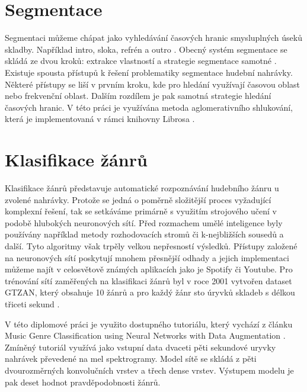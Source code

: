 \section{Segmentace} \label{sec:Teorie_Segmentace}
Segmentaci můžeme chápat jako vyhledávání časových hranic smysluplných úseků skladby. Například intro, sloka, refrén a outro \cite{Segmentation_introduction}. Obecný systém segmentace se skládá ze dvou kroků: extrakce vlastností a strategie segmentace samotné \cite{Multiclass_audio_segmentation}. Existuje spousta přístupů k řešení problematiky segmentace hudební nahrávky. Některé přístupy se liší v prvním kroku, kde pro hledání využívají časovou oblast nebo frekvenční oblast. Dalším rozdílem je pak samotná strategie hledání časových hranic. V této práci je využívána metoda aglomerativního shlukování, která je implementovaná v rámci knihovny Librosa \cite{Librosa}.


\section{Klasifikace žánrů} \label{sec:Klasifikace_zanru}
Klasifikace žánrů představuje automatické rozpoznávání hudebního žánru u zvolené nahrávky. Protože se jedná o poměrně složitější proces vyžadující komplexní řešení, tak se setkáváme primárně s využitím strojového učení v podobě hlubokých neuronových sítí. Před rozmachem umělé inteligence byly používány například metody rozhodovacích stromů či k-nejbližších sousedů a další. Tyto algoritmy však trpěly velkou nepřesností výsledků. Přístupy založené na neuronových sítí poskytují mnohem přesnější odhady a jejich implementaci můžeme najít v celosvětově známých aplikacích jako je Spotify či Youtube\cite{Music_genre_classification}. 
Pro trénování sítí zaměřených na klasifikaci žánrů byl v roce 2001 vytvořen dataset GTZAN, který obsahuje 10 žánrů a pro každý žánr sto úryvků skladeb s délkou třiceti sekund \cite{GTZAN}. 

V této diplomové práci je využito dostupného tutoriálu, který vychází z článku Music Genre Classification using Neural Networks with Data Augmentation \cite{Music_classification_using_deep_learning, Music_genre_classification_paper}. Zmíněný tutoriál využívá jako vstupní data dvaceti pěti sekundové uryvky nahrávek převedené na mel spektrogramy. Model sítě se skládá z pěti dvourozměrných konvolučních vrstev a třech dense vrstev. Výstupem modelu je pak deset hodnot pravděpodobnosti žánrů.


